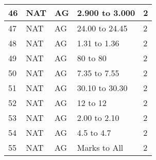 \documentclass[12pt]{article}
\begin{document}
\begin{center}
\begin{longtable}{|p{2.5cm}|p{2.5cm}|p{2.5cm}|p{6cm}|p{2.5cm}|}
			46 & NAT & AG & 2.900 to 3.000 & 2 \\
			\hline
			47 & NAT & AG & 24.00 to 24.45 & 2 \\
			\hline
			48 & NAT & AG & 1.31 to 1.36 & 2 \\
			\hline
			49 & NAT & AG & 80 to 80 & 2 \\
			\hline
			50 & NAT & AG & 7.35 to 7.55 & 2 \\
			\hline
			51 & NAT & AG & 30.10 to 30.30 & 2 \\
			\hline
			52 & NAT & AG & 12 to 12 & 2 \\
			\hline
			53 & NAT & AG & 2.00 to 2.10 & 2 \\
			\hline
			54 & NAT & AG & 4.5 to 4.7 & 2 \\
			\hline
			55 & NAT & AG & Marks to All & 2 \\
			\hline
		\end{longtable}
	\end{center}
\end{document}
